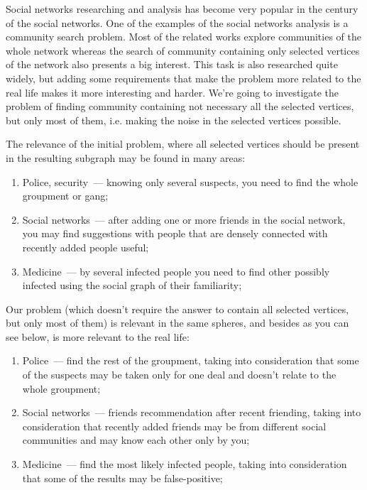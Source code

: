 \startprefacepage

Social networks researching and analysis has become very popular in the century of the social networks. One of the examples of the social networks analysis is a community search problem. Most of the related works explore communities of the whole network whereas the search of community containing only selected vertices of the network also presents a big interest. This task is also researched quite widely, but adding some requirements that make the problem more related to the real life makes it more interesting and harder. We're going to investigate the problem of finding community containing not necessary all the selected vertices, but only most of them, i.e. making the noise in the selected vertices possible.

The relevance of the initial problem, where all selected vertices should be present in the resulting subgraph may be found in many areas:

\begin{enumerate}
  \item Police, security~--- knowing only several suspects, you need to find the whole groupment or gang;
  \item Social networks~--- after adding one or more friends in the social network, you may find suggestions with people that are densely connected with recently added people useful;
  \item Medicine~--- by several infected people you need to find other possibly infected using the social graph of their familiarity;
\end{enumerate}

Our problem (which doesn't require the answer to contain all selected vertices, but only most of them) is relevant in the same spheres, and besides as you can see below, is more relevant to the real life:

\begin{enumerate}
  \item Police~--- find the rest of the groupment, taking into consideration that some of the suspects may be taken only for one deal and doesn't relate to the whole groupment;
  \item Social networks~--- friends recommendation after recent friending, taking into consideration that recently added friends may be from different social communities and may know each other only by you;
  \item Medicine~--- find the most likely infected people, taking into consideration that some of the results may be false-positive;
\end{enumerate}

